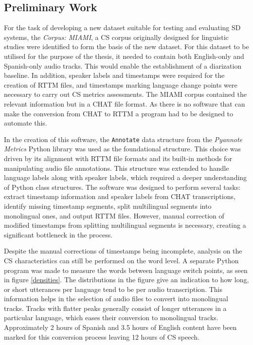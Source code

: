 \documentclass[11pt, a4paper]{report}
\begin{document}
\subsection*{Preliminary Work}
For the task of developing a new dataset suitable for testing and evaluating SD 
systems, the \textit{Corpus: MIAMI}, a CS corpus originally designed for linguistic 
studies were identified to form the basis of the new dataset. 
For this dataset to be utilised for the purpose of the thesis, it needed to 
contain both English-only and Spanish-only audio tracks. This would 
enable the establishment of a diarization baseline. In addition, 
speaker labels and timestamps were required for the creation of RTTM files, 
and timestamps marking language change points were necessary to carry out 
CS metrics assessments. The MIAMI corpus contained the relevant information but 
in a CHAT file format. As there is no software that can make the conversion from
CHAT to RTTM a program had to be designed to automate this.

\vspace*{10pt}
In the creation of this software, the \lstinline{Annotate} data structure from 
the \textit{Pyannote Metrics} Python library was used as the foundational 
structure. This choice was driven by its alignment with RTTM file formats 
and its built-in methods for manipulating audio file annotations. This structure 
was extended to handle language labels along with speaker labels, which required 
a deeper understanding of Python class structures. The software was designed to 
perform several tasks: extract timestamp information and speaker labels from CHAT 
transcriptions, identify missing timestamp segments, split multilingual segments 
into monolingual ones, and output RTTM files. However, manual correction of modified
 timestamps from splitting multilingual segments is necessary, creating a significant 
bottleneck in the process. 

\vspace*{10pt}
Despite the manual corrections of timestamps being incomplete, analysis on the CS 
characteristics can still be performed on the word level. A separate Python program 
was made to measure the words between language switch points, as seen in 
figure \ref*{densities}. The distributions in the figure give an indication to 
how long, or short utterances per language tend to be per audio transcription.
This information helps in the selection of audio files to convert into monolingual 
tracks. Tracks with flatter peaks generally consist of longer utterances in a 
particular language, which eases their conversion to monolingual tracks. 
Approximately 2 hours of Spanish and 3.5 hours of English content 
have been marked for this conversion process leaving 12 hours of CS speech.
\end{document}
